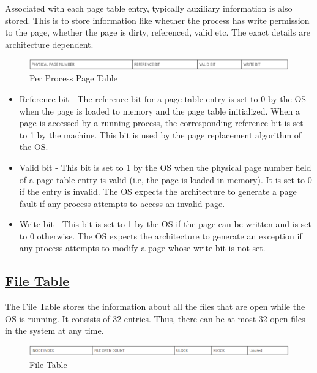 Associated with each page table entry, typically auxiliary information is also stored. This is to store information like whether the process has write permission to the page, whether the page is dirty, referenced, valid etc. The exact details are architecture dependent.

\begin{figure}[ht]
\centering
\includegraphics  [scale=0.55]{figures/pgt.png}
\caption{\footnotesize Per Process Page Table}
\end{figure}

\begin {itemize}
\item Reference bit - The reference bit for a page table entry is set to 0 by the OS when the page is loaded to memory and the page table initialized. When a page is accessed by a running process, the corresponding reference bit is set to 1 by the machine. This bit is used by the page replacement algorithm of the OS.
\item Valid bit - This bit is set to 1 by the OS when the physical page number field of a page table entry is valid (i.e, the page is loaded in memory). It is set to 0 if the entry is invalid. The OS expects the architecture to generate a page fault if any process attempts to access an invalid page.
\item Write bit - This bit is set to 1 by the OS if the page can be written and is set to 0 otherwise. The OS expects the architecture to generate an exception if any process attempts to modify a page whose write bit is not set.
\end {itemize}

\subsection{\href{http://exposnitc.github.io/os_design-files/mem_ds.html#file_table}{File Table}}
The File Table stores the information about all the files that are open while the OS is running. It consists of 32 entries. Thus, there can be at most 32 open files in the system at any time.
\begin{figure}[ht]
\centering
\includegraphics  [scale=0.55]{figures/ft.png}
\caption{\footnotesize File Table}
\end{figure}


